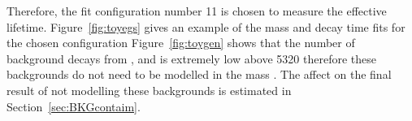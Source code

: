 {%



Therefore, the fit configuration number 11 is chosen to measure the \bsmumu effective lifetime. Figure~\ref{fig:toyegs} gives an example of the mass and decay time \ml fits for the chosen configuration Figure~\ref{fig:toygen} shows that the number of background decays from \bdmumu, \bhh and \lambdab is extremely low above 5320 \mevcc therefore these backgrounds do not need to be modelled in the mass \pdf. The affect on the final result of not modelling these backgrounds is estimated in Section~\ref{sec:BKGcontaim}.

}
